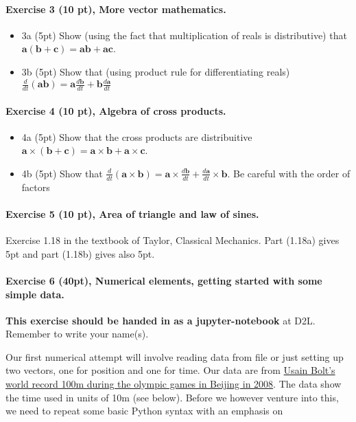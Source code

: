 \documentclass[%
oneside,                 %
final,                   %
10pt]{article}
\begin{document}
\noindent
\paragraph{Exercise 3 (10 pt), More vector mathematics.}
\begin{itemize}
\item 3a (5pt) Show (using the fact that multiplication of reals is distributive) that $\bm{a}(\bm{b}+\bm{c})=\bm{a}\bm{b}+\bm{a}\bm{c}$.

\item 3b (5pt) Show that (using product rule for differentiating reals)  $\frac{d}{dt}(\bm{a}\bm{b})=\bm{a}\frac{d\bm{b}}{dt}+\bm{b}\frac{d\bm{a}}{dt}$
\end{itemize}

\noindent
\paragraph{Exercise 4 (10 pt), Algebra of cross products.}
\begin{itemize}
\item 4a (5pt) Show that the cross products are distribuitive $\bm{a}\times(\bm{b}+\bm{c})=\bm{a}\times\bm{b}+\bm{a}\times\bm{c}$.

\item 4b (5pt) Show that $\frac{d}{dt}(\bm{a}\times\bm{b})=\bm{a}\times\frac{d\bm{b}}{dt}+\frac{d\bm{a}}{dt}\times \bm{b}$. Be careful with the order of factors 
\end{itemize}

\noindent
\paragraph{Exercise 5 (10 pt), Area of triangle and law of sines.}
Exercise 1.18 in the textbook of Taylor, Classical Mechanics. Part (1.18a) gives 5pt and part (1.18b) gives also 5pt.

\paragraph{Exercise 6 (40pt), Numerical elements, getting started with some simple data.}
\textbf{This exercise should be handed in as a jupyter-notebook} at D2L. Remember to write your name(s). 

Our first numerical attempt will involve reading data from file or
just setting up two vectors, one for position and one for time. Our data are from 
\href{{https://www.youtube.com/watch?v=93dC0o2aHto}}{Usain Bolt's world record 100m during the olympic games in Beijing in
2008}. The data show the time used in units of 10m (see below). Before we however
venture into this, we need to repeat some basic Python syntax with an
emphasis on
\end{document}
